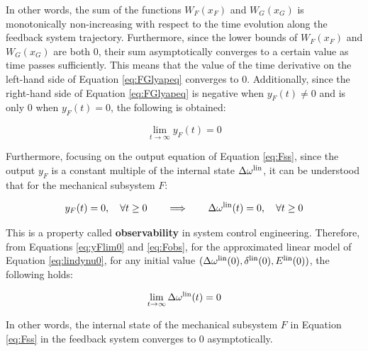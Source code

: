 \documentclass[graybox, envcountchap]{svmult}
\begin{document}
In other words, the sum of the functions $W_F(x_F)$ and $W_G(x_G)$ is
monotonically non-increasing with respect to the time evolution along the
feedback system trajectory. Furthermore, since the lower bounds of $W_F(x_F)$
and $W_G(x_G)$ are both 0, their sum asymptotically converges to a certain value
as time passes sufficiently. This means that the value of the time derivative on
the left-hand side of Equation \ref{eq:FGlyapeq} converges to 0. Additionally,
since the right-hand side of Equation \ref{eq:FGlyapeq} is negative when $y_F(t)
\neq 0$ and is only 0 when $y_F(t) = 0$, the following is obtained: 

\begin{equation}\label{eq:yFlim0}
  \lim_{t\rightarrow \infty} y_F(t)  =0
\end{equation}

Furthermore, focusing on the output equation of Equation \ref{eq:Fss}, since the
output $y_F$ is a constant multiple of the internal state $\Delta \omega^{\rm
lin}$, it can be understood that for the mechanical subsystem $F$:

\begin{equation}\label{eq:Fobs}
  y_F(t)  =0,\quad \forall t\geq 0 
  \qquad \Longrightarrow \qquad
  \Delta \omega^{\rm lin}(t)  =0,\quad \forall t\geq 0 
\end{equation}

This is a property called \textbf{observability} in system control engineering.
Therefore, from Equations \ref{eq:yFlim0} and \ref{eq:Fobs}, for the
approximated linear model of Equation \ref{eq:lindynu0}, for any initial value
$(\Delta \omega^{\rm lin}(0),\delta^{\rm lin}(0),E^{\rm lin}(0))$, the following
holds:

\begin{equation}\label{eq:Delom0}
  \lim_{t\rightarrow \infty} \Delta \omega^{\rm lin}(t)  =0
\end{equation}

In other words, the internal state of the mechanical subsystem $F$ in Equation
\ref{eq:Fss} in the feedback system converges to 0 asymptotically.
\end{document}
